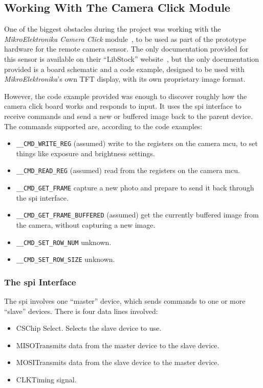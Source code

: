 \subsection{Working With The Camera Click Module}
One of the biggest obstacles during the project was working with the
\textit{MikroElektronika Camera Click} module~\cite{cameraclick}, to be used
as part of the prototype hardware for the remote camera sensor. The only
documentation provided for this sensor is available on their ``LibStock''
website~\cite{cameraclickexamples}, but the only documentation provided is a
board schematic and a code example, designed to be used with
\textit{MikroElektronika}'s own TFT display, with its own proprietary image
format.

However, the code example provided was enough to discover roughly how the
camera click board works and responds to input. It uses the \acrshort{spi}
interface to receive commands and send a new or buffered image back to the
parent device. The commands supported are, according to the code examples:

\begin{itemize}
  \item \texttt{\_\_CMD\_WRITE\_REG} (assumed) write to the registers on the
  camera \acrfull{mcu}, to set things like exposure and brightness settings.
  \item \texttt{\_\_CMD\_READ\_REG} (assumed) read from the registers on the
  camera \acrshort{mcu}.
  \item \texttt{\_\_CMD\_GET\_FRAME} capture a new photo and prepare to send
  it back through the \acrshort{spi} interface.
  \item \texttt{\_\_CMD\_GET\_FRAME\_BUFFERED} (assumed) get the currently
  buffered image from the camera, without capturing a new image.
  \item \texttt{\_\_CMD\_SET\_ROW\_NUM} unknown.
  \item \texttt{\_\_CMD\_SET\_ROW\_SIZE} unknown.
\end{itemize}

\subsubsection{The \acrshort{spi} Interface}
The \acrshort{spi} involves one ``master'' device, which sends commands to
one or more ``slave'' devices. There is four data lines involved:

\begin{itemize}
  \item CS\textemdash{}Chip Select. Selects the slave device to use.
  \item MISO\textemdash{}Transmits data from the master device to the slave
  device.
  \item MOSI\textemdash{}Transmits data from the slave device to the master
  device.
  \item CLK\textemdash{}Timing signal.
\end{itemize}

